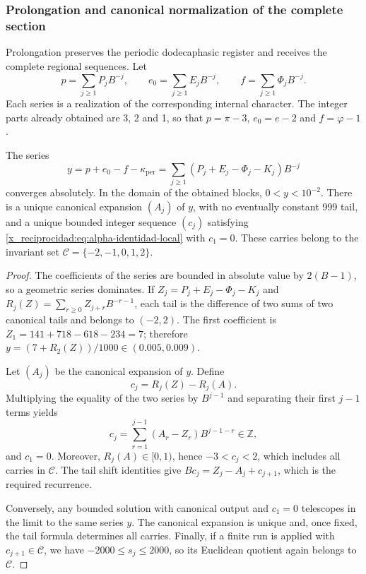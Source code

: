\subsubsection{Prolongation and canonical normalization of the complete section}
\label{x_reciprocidad:subsec:alpha-completa}

Prolongation preserves the periodic dodecaphasic register and receives the complete regional
sequences. Let
\[
 p=\sum_{j\geq1}P_jB^{-j},\qquad
 e_0=\sum_{j\geq1}E_jB^{-j},\qquad
 f=\sum_{j\geq1}\Phi_jB^{-j}.
\]
Each series is a realization of the corresponding internal character.
The integer parts already obtained are 3, 2 and 1, so that
\(p=\pi-3\), \(e_0=e-2\) and
\(f=\varphi-1\).

\begin{proposition}
\label{x_reciprocidad:prop:alpha-normalizacion}
The series
\begin{equation}
 y=p+e_0-f-\kappa_{\mathrm{per}}
   =\sum_{j\geq1}(P_j+E_j-\Phi_j-K_j)B^{-j}
 \label{x_reciprocidad:eq:alpha-serie}
\end{equation}
converges absolutely. In the domain of the obtained blocks,
\(0<y<10^{-2}\). There is a unique canonical expansion \((A_j)\) of
\(y\), with no eventually constant 999 tail, and a unique bounded integer
sequence \((c_j)\) satisfying \eqref{x_reciprocidad:eq:alpha-identidad-local} with
\(c_1=0\). These carries belong to the invariant set
\(\mathcal C=\{-2,-1,0,1,2\}\).
\end{proposition}

\begin{proof}
The coefficients of the series are bounded in absolute value by \(2(B-1)\),
so a geometric series dominates. If
\(Z_j=P_j+E_j-\Phi_j-K_j\) and
\(R_j(Z)=\sum_{r\geq0}Z_{j+r}B^{-r-1}\), each tail is the difference
of two sums of two canonical tails and belongs to \((-2,2)\).
The first coefficient is
\(Z_1=141+718-618-234=7\); therefore
\(y=(7+R_2(Z))/1000\in(0.005,0.009)\).

Let \((A_j)\) be the canonical expansion of \(y\). Define
\[
 c_j=R_j(Z)-R_j(A).
\]
Multiplying the equality of the two series by \(B^{j-1}\) and separating
their first \(j-1\) terms yields
\[
 c_j=\sum_{r=1}^{j-1}(A_r-Z_r)B^{j-1-r}\in\mathbb Z,
\]
and \(c_1=0\). Moreover, \(R_j(A)\in[0,1)\), hence
\(-3<c_j<2\), which includes all carries in \(\mathcal C\).
The tail shift identities give
\(Bc_j=Z_j-A_j+c_{j+1}\), which is the required recurrence.

Conversely, any bounded solution with canonical output and
\(c_1=0\) telescopes in the limit to the same series \(y\). The canonical
expansion is unique and, once fixed, the tail formula determines
all carries. Finally, if a finite run is applied with
\(c_{j+1}\in\mathcal C\), we have \(-2000\leq s_j\leq2000\),
so its Euclidean quotient again belongs to \(\mathcal C\).
\end{proof}

